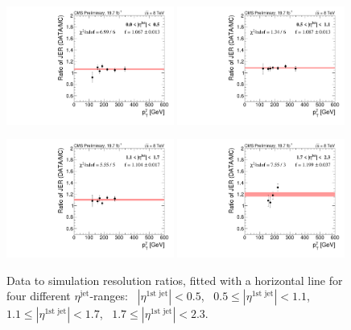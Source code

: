 \begin{figure}[!b]
 \centering
    \includegraphics[width=0.49\textwidth]{figures/resolution/results/Ratio_Resolution_for_1_eta_bin_PFCHS_data_comparison_RMS99.pdf}
    \includegraphics[width=0.49\textwidth]{figures/resolution/results/Ratio_Resolution_for_2_eta_bin_PFCHS_data_comparison_RMS99.pdf}

    \includegraphics[width=0.49\textwidth]{figures/resolution/results/Ratio_Resolution_for_3_eta_bin_PFCHS_data_comparison_RMS99.pdf}
    \includegraphics[width=0.49\textwidth]{figures/resolution/results/Ratio_Resolution_for_4_eta_bin_PFCHS_data_comparison_RMS99.pdf}
  \caption{Data to simulation resolution ratios, fitted with a horizontal line for four different $\eta^{\text{jet}}$-ranges: 
           \mbox{ $|\eta^{\text{1st jet}}| < 0.5$},
           \mbox{ $0.5\le|\eta^{\text{1st jet}}| < 1.1$},
           \mbox{ $1.1\le|\eta^{\text{1st jet}}| < 1.7$},
           \mbox{ $1.7\le|\eta^{\text{1st jet}}| < 2.3$}.}
  \label{fig:RatioEtaBinned}
\end{figure}

